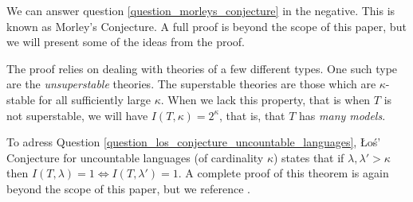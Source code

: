

We can answer question \ref{question_morleys_conjecture} in the negative. This is known as Morley's Conjecture. A full proof is beyond the scope of this paper, but we will present some of the ideas from the proof. 

The proof relies on dealing with theories of a few different types.\cite{hart}
One such type are the \textit{unsuperstable} theories. 
The superstable theories are those which are \(\kappa\)-stable for all sufficiently large \(\kappa\).
When we lack this property, that is when \(T\) is not superstable, we will have \(I(T, \kappa) = 2^\kappa\), that is, that \(T\) has \textit{many models}. \cite{shelahUnsuperstable}



To adress Question \ref{question_los_conjecture_uncountable_languages}, \L o\'s' Conjecture for uncountable languages (of cardinality \(\kappa\)) states that if \(\lambda, \lambda' >\kappa\) then \(I(T, \lambda) = 1 \iff I(T, \lambda') = 1\). 
A complete proof of this theorem is again beyond the scope of this paper, but we reference \cite{shelahUncountable}.